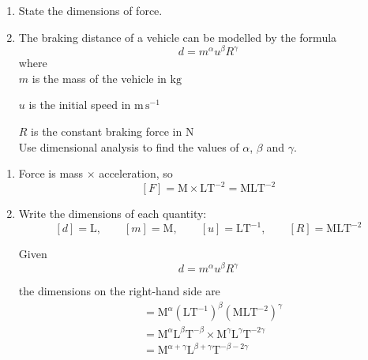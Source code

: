 \documentclass[leqno]{article}
\begin{document}
\djsFrontMatter
\begin{enumerate}[
  label=\textbf{\arabic*.},
  leftmargin=*,
  topsep=0pt,
  partopsep=0pt,
  parsep=0pt
]

\questionitem

\begin{enumerate}[label=\textbf{(\alph*)}]
  \item State the dimensions of force.  \\
  \item The braking distance of a vehicle can be modelled by the formula
  \[
  d = m^{\alpha} u^{\beta} R^{\gamma}
  \] 
  where \\

  $m$ is the mass of the vehicle in $\mathrm{kg}$

  $u$ is the initial speed in $\mathrm{m\,s^{-1}}$

  $R$ is the constant braking force in $\mathrm{N}$ \\
  
  Use dimensional analysis to find the values of $\alpha$, $\beta$ and $\gamma$.  \\
\end{enumerate}

\vspace*{10pt}

\begin{djsSolution}
\begin{enumerate}[label=\textbf{(\alph*)}, start=1]
  \item Force is mass $\times$ acceleration, so
  \[
  [F]=\mathrm{M}\times\mathrm{LT^{-2}}=\mathrm{MLT^{-2}}
  \]

  \item Write the dimensions of each quantity:
  \[
  [d]=\mathrm{L},\qquad [m]=\mathrm{M},\qquad [u]=\mathrm{LT^{-1}},\qquad [R]=\mathrm{MLT^{-2}}
  \]

  Given
  \[
  d=m^{\alpha} u^{\beta} R^{\gamma}
  \]

  the dimensions on the right-hand side are
  \begin{align*}
  [m^{\alpha} u^{\beta} R^{\gamma}]
  &=\mathrm{M}^{\alpha}(\mathrm{LT^{-1}})^{\beta}(\mathrm{MLT^{-2}})^{\gamma}\\
  &=\mathrm{M}^{\alpha}\mathrm{L}^{\beta}\mathrm{T}^{-\beta}\times\mathrm{M}^{\gamma}\mathrm{L}^{\gamma}\mathrm{T}^{-2\gamma}\\
  &=\mathrm{M}^{\alpha+\gamma}\mathrm{L}^{\beta+\gamma}\mathrm{T}^{-\beta-2\gamma}
  \end{align*}


\end{enumerate}
\end{djsSolution}
\end{enumerate}
\end{document}
